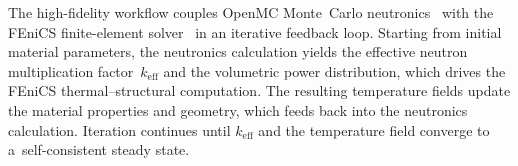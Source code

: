 \documentclass[pdflatex,sn-mathphys-num]{sn-jnl}
\theoremstyle{thmstyleone}
\theoremstyle{thmstyletwo}
\theoremstyle{thmstylethree}
\begin{document}

The high-fidelity workflow couples OpenMC Monte~Carlo neutronics~\cite{ref:openmc}
with the FEniCS finite-element solver~\cite{ref:fenics} in an iterative feedback loop.
Starting from initial material parameters, the neutronics calculation yields the
effective neutron multiplication factor~$k_{\mathrm{eff}}$ and the volumetric power
distribution, which drives the FEniCS thermal--structural computation.
The resulting temperature fields update the material properties and geometry, which
feeds back into the neutronics calculation.
Iteration continues until $k_{\mathrm{eff}}$ and the temperature field converge to
a~self-consistent steady state.

\end{document}
